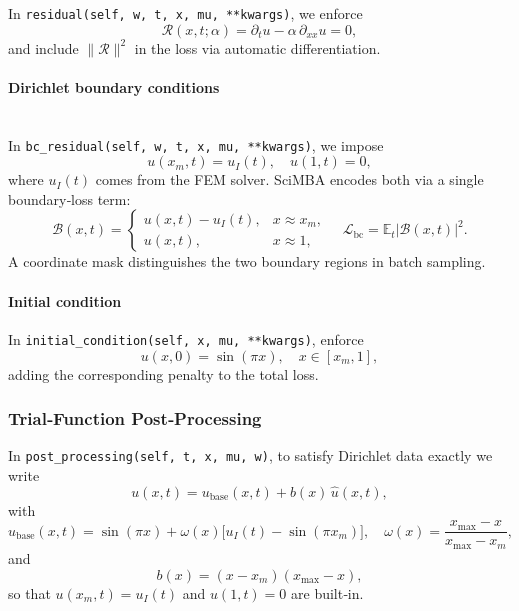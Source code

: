 \documentclass[12pt]{article}
\begin{document}
In \texttt{residual(self, w, t, x, mu, **kwargs)}, we enforce
\begin{equation}
  \mathcal{R}(x,t;\alpha)
  = \partial_t u - \alpha\,\partial_{xx}u = 0,
\end{equation}
and include \(\|\mathcal{R}\|^2\) in the loss via automatic differentiation.

\paragraph{Dirichlet boundary conditions}\mbox{}\\
In \texttt{bc\_residual(self, w, t, x, mu, **kwargs)}, we impose
\begin{equation}
  u(x_m,t)=u_I(t),\quad
  u(1,t)=0,
\end{equation}
where \(u_I(t)\) comes from the FEM solver.  SciMBA encodes both via a single boundary‐loss term:
\begin{equation}
  \mathcal{B}(x,t) = 
  \begin{cases}
    u(x,t)-u_I(t), & x\approx x_m,\\
    u(x,t),       & x\approx 1,
  \end{cases}
  \quad
  \mathcal{L}_{\mathrm{bc}}=\mathbb{E}_t\bigl|\mathcal{B}(x,t)\bigr|^2.
\end{equation}
A coordinate mask distinguishes the two boundary regions in batch sampling.

\paragraph{Initial condition}\textbf{}
In \texttt{initial\_condition(self, x, mu, **kwargs)}, enforce
\begin{equation}
  u(x,0)=\sin(\pi x),\quad x\in[x_m,1],
\end{equation}
adding the corresponding penalty to the total loss.

\subsubsection{Trial‐Function Post‐Processing}

In \texttt{post\_processing(self, t, x, mu, w)}, to satisfy Dirichlet data exactly we write
\begin{equation}
  u(x,t) = u_{\mathrm{base}}(x,t) + b(x)\,\widehat u(x,t),
\end{equation}
with
\begin{equation}
  u_{\mathrm{base}}(x,t)
    = \sin(\pi x)
      + \omega(x)\bigl[u_I(t)-\sin(\pi x_m)\bigr],
  \quad
  \omega(x)=\frac{x_{\max}-x}{x_{\max}-x_m},
\end{equation}
and
\begin{equation}
  b(x)=(x-x_m)(x_{\max}-x),
\end{equation}
so that \(u(x_m,t)=u_I(t)\) and \(u(1,t)=0\) are built‐in.
\end{document}
